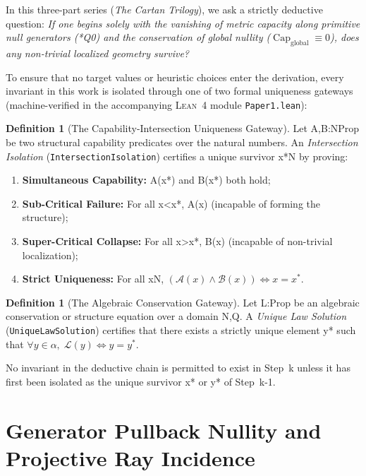 \documentclass[11pt,reqno]{amsart}
\theoremstyle{definition}
\newtheorem{definition}[theorem]{Definition}
\theoremstyle{remark}
\newcommand{\CapGlobal}{\operatorname{Cap}_{\mathrm{global}}}
\begin{document}
In this three-part series (\emph{The Cartan Trilogy}), we ask a strictly deductive question: \emph{If one begins solely with the vanishing of metric capacity along primitive null generators (*Q0) and the conservation of global nullity ($\CapGlobal \equiv 0$), does any non-trivial localized geometry survive?}

To ensure that no target values or heuristic choices enter the derivation, every invariant in this work is isolated through one of two formal uniqueness gateways (machine-verified in the accompanying \textsc{Lean~4} module \texttt{Paper1.lean}):

\begin{definition}[The Capability-Intersection Uniqueness Gateway]
\label{def:intersection_isolation}
Let A,B:NProp be two structural capability predicates over the natural numbers. An \emph{Intersection Isolation} (\texttt{IntersectionIsolation}) certifies a unique survivor x*N by proving:
\begin{enumerate}[label=(\roman*)]
  \item \textbf{Simultaneous Capability:} A(x*) and B(x*) both hold;
  \item \textbf{Sub-Critical Failure:} For all x<x*, A(x) (incapable of forming the structure);
  \item \textbf{Super-Critical Collapse:} For all x>x*, B(x) (incapable of non-trivial localization);
  \item \textbf{Strict Uniqueness:} For all xN, $(\mathcal{A}(x) \wedge \mathcal{B}(x)) \iff x = x^*$.
\end{enumerate}
\end{definition}

\begin{definition}[The Algebraic Conservation Gateway]
\label{def:unique_law_solution}
Let L:Prop be an algebraic conservation or structure equation over a domain {N,Q}. A \emph{Unique Law Solution} (\texttt{UniqueLawSolution}) certifies that there exists a strictly unique element y* such that $\forall y \in \alpha,\; \mathcal{L}(y) \iff y = y^*$.
\end{definition}

No invariant in the deductive chain is permitted to exist in Step~k unless it has first been isolated as the unique survivor x* or y* of Step~k-1.

\section{Generator Pullback Nullity and Projective Ray Incidence}
\end{document}
